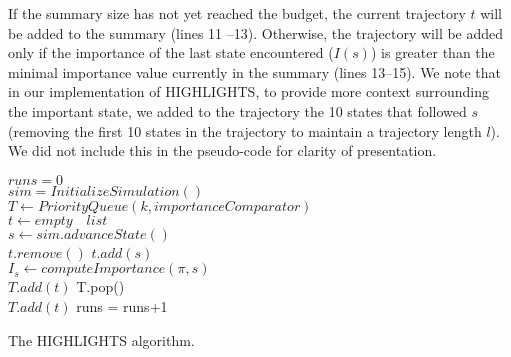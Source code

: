 If the summary size has not yet reached the budget, the current trajectory $t$ will be added to the summary (lines 11 --13). Otherwise, the trajectory will be added only if the importance of the last state encountered ($I(s)$) is greater than the minimal importance value currently in the summary (lines 13--15). We note that in our implementation of HIGHLIGHTS, to provide more context surrounding the important state, we added to the trajectory the 10 states that followed $s$ (removing the first 10 states in the trajectory to maintain a trajectory length $l$). We did not include this in the pseudo-code for clarity of presentation. 


\begin{algorithm}
\SetAlFnt{\small\sf} 
\DontPrintSemicolon %
$runs = 0$ \\
$sim = InitializeSimulation()$ \\
$T \leftarrow PriorityQueue(k, importanceComparator)$ \\
$t \leftarrow empty \quad list$ \\
 {
$s \leftarrow sim.advanceState()$ \\
 {
$t.remove()$ 
}
$t.add(s)$ \\
$I_{s} \leftarrow computeImportance(\pi,s)$ \\
 {
$T.add(t)$ 
}
 {
T.pop() \\
$T.add(t)$ 
}
runs = runs+1
}
\caption{The HIGHLIGHTS algorithm. }
\label{alg:highlights}
\end{algorithm}


